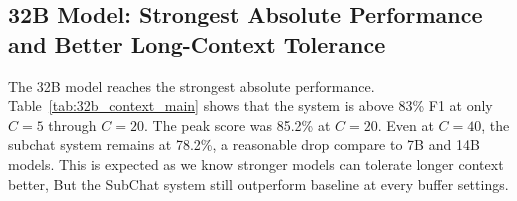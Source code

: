 \documentclass[pdflatex,sn-mathphys-num]{sn-jnl}%
\theoremstyle{thmstyleone}%
\theoremstyle{thmstyletwo}%
\theoremstyle{thmstylethree}%
\begin{document}
\subsection{32B Model: Strongest Absolute Performance and Better Long-Context Tolerance}\label{subsec:results_32b}







The 32B model reaches the strongest absolute performance. Table~\ref{tab:32b_context_main} shows that the system is above 83\% F1 at only $C=5$ through $C=20$. The peak score was 85.2\% at $C=20$. Even at $C=40$, the subchat system remains at 78.2\%, a reasonable drop compare to 7B and 14B models. This is expected as we know stronger models can tolerate longer context better, But the SubChat system still outperform baseline at every buffer settings.
\end{document}
